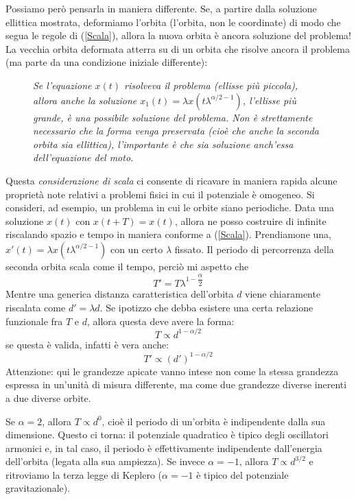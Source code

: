 \documentclass[a4paper,openany]{article}
\begin{document}
	Possiamo però pensarla in maniera differente. Se, a partire dalla soluzione ellittica mostrata, deformiamo l'orbita (l'orbita, non le coordinate) di modo che segua le regole di (\ref{Scala}), allora la nuova orbita è ancora soluzione del problema! La vecchia orbita deformata atterra su di un orbita che risolve ancora il problema (ma parte da una condizione iniziale differente):
	
	\begin{figure}[H]
		\centering
		\caption{\textit{Se l'equazione $x(t)$ risolveva il problema (ellisse più piccola), allora anche la soluzione $x_{1}(t) = \lambda x(t \lambda^{\alpha/2-1})$, l'ellisse più grande, è una possibile soluzione del problema. Non è strettamente necessario che la forma venga preservata (cioè che anche la seconda orbita sia ellittica), l'importante è che sia soluzione anch'essa dell'equazione del moto.}}
	\end{figure}
	Questa \textit{considerazione di scala} ci consente di ricavare in maniera rapida alcune proprietà note relativi a problemi fisici in cui il potenziale è omogeneo. Si consideri, ad esempio, un problema in cui le orbite siano periodiche. Data una soluzione $x(t)$ con $x(t+T) = x(t)$, allora ne posso costruire di infinite riscalando spazio e tempo in maniera conforme a (\ref{Scala}). Prendiamone una, $x'(t) = \lambda x(t \lambda^{\alpha/2-1}) $ con un certo $\lambda$ fissato. Il periodo di percorrenza della seconda orbita scala come il tempo, perciò mi aspetto che
	$$
	T' = T \lambda^{1-\dfrac{\alpha}{2}}
	$$
	Mentre una generica distanza caratteristica dell'orbita $d$ viene chiaramente riscalata come $d' = \lambda d$. Se ipotizzo che debba esistere una certa relazione funzionale fra $T$ e $d$, allora questa deve avere la forma:
	$$
	T \propto  d^{1-\alpha /2}
	$$
	se questa è valida, infatti è vera anche:
	$$
	T' \propto  (d')^{1-\alpha /2}
	$$
	Attenzione: qui le grandezze apicate vanno intese non come la stessa grandezza espressa in un'unità di misura differente, ma come due grandezze diverse inerenti a due diverse orbite.
	
	Se $\alpha = 2$, allora $T \propto d^{0}$, cioè il periodo di un'orbita è indipendente dalla sua dimensione. Questo ci torna: il potenziale quadratico è tipico degli oscillatori armonici e, in tal caso, il periodo è effettivamente indipendente dall'energia dell'orbita (legata alla sua ampiezza). Se invece $\alpha=-1$, allora $T\propto d^{3/2}$ e ritroviamo la terza legge di Keplero ($\alpha = -1$ è tipico del potenziale gravitazionale).
\end{document}
